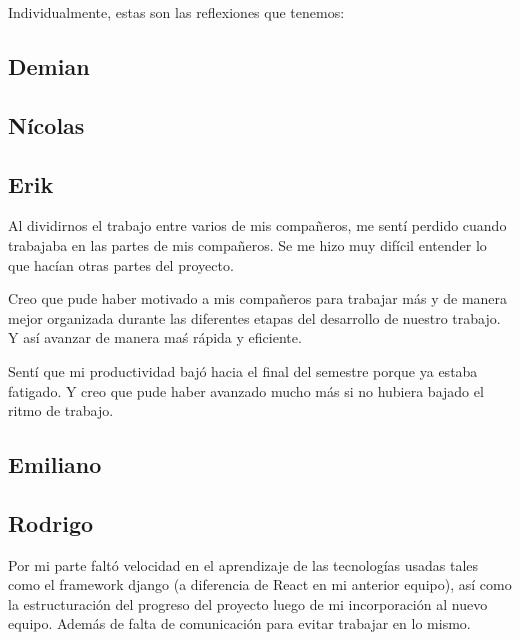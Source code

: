 \documentclass[12pt]{article}
\newcounter{ni}
\begin{document}
\vspace{1cm}
Individualmente, estas son las reflexiones que tenemos:

\subsection{Demian}
\subsection{Nícolas}
\subsection{Erik}
Al dividirnos el trabajo entre varios de mis compañeros, me sentí perdido cuando trabajaba en las partes de mis compañeros. Se me hizo muy difícil entender lo que hacían otras partes del proyecto.

Creo que pude haber motivado a mis compañeros para trabajar más y de manera mejor organizada durante las diferentes etapas del desarrollo de nuestro trabajo. Y así avanzar de manera maś rápida y eficiente.

Sentí que mi productividad bajó hacia el final del semestre porque ya estaba fatigado. Y creo que pude haber avanzado mucho más si no hubiera bajado el ritmo de trabajo.

\subsection{Emiliano}
\subsection{Rodrigo}
Por mi parte faltó velocidad en el aprendizaje de las tecnologías usadas tales como el framework django (a diferencia de React en mi anterior equipo),
así como la estructuración del progreso del proyecto luego de mi incorporación al nuevo equipo. Además de falta de comunicación para evitar trabajar en lo mismo.
\end{document}

